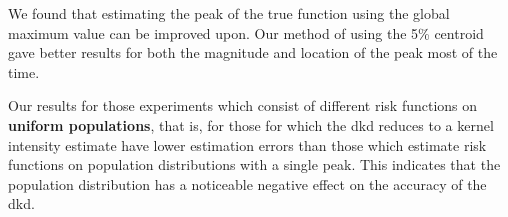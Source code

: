 We found that estimating the peak of the true function using the global maximum value can be improved upon.
Our method of using the 5\% centroid gave better results for both the magnitude and location of the peak most of the time.

Our results for those experiments which consist of different \gls{risk} functions on
\textbf{uniform populations},
that is,
for those for which the \gls{dkd} reduces to a kernel intensity estimate
have lower estimation errors than those which estimate
\gls{risk} functions on population distributions with a single peak.
This indicates that the population distribution has a noticeable negative effect on the accuracy of the \gls{dkd}.


